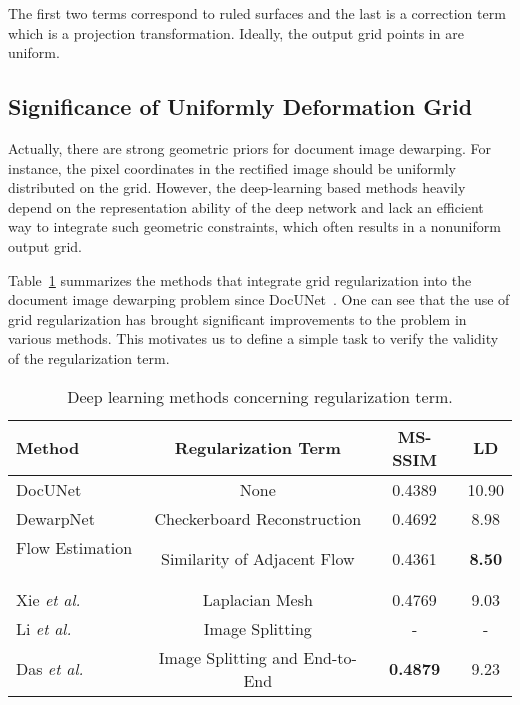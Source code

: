 \documentclass[10pt,twocolumn,letterpaper]{article}
\begin{document}
The first two terms correspond to ruled surfaces and the last is a correction term which is a projection transformation. 
Ideally, the output grid points in  are uniform.


\subsection{Significance of Uniformly Deformation Grid}

Actually, there are strong geometric priors for document image dewarping. For instance, the pixel coordinates in the rectified image should be uniformly distributed on the grid. However, the deep-learning based methods heavily depend on the representation ability of the deep network and lack an efficient way to integrate such geometric constraints, which often results in a nonuniform output grid. 

Table~\ref{tab:Related method} summarizes the methods that integrate grid regularization into the document image dewarping problem since DocUNet~\cite{Ma_2018_CVPR}. One can see that the use of grid regularization has brought significant improvements to the problem in various methods. This motivates us to define a simple task to verify the validity of the regularization term. 


\begin{table}[!t]
\scriptsize
  \centering
    \caption{Deep learning methods concerning regularization term.}
    \vspace{-3mm}
  \begin{tabular}{lccc}
    \toprule
    \textbf{Method} &  \textbf{Regularization Term}  & \textbf{MS-SSIM}   & \textbf{LD} \\
    \midrule
    DocUNet~\cite{Ma_2018_CVPR} & None   & 0.4389& 10.90\\
    DewarpNet~\cite{Das_2019_ICCV} & Checkerboard Reconstruction & 0.4692 & 8.98 \\
    Flow Estimation ~\cite{xie2020dewarping}&Similarity of Adjacent Flow & 0.4361&\textbf{8.50}\\
    Xie {\em et al.} ~\cite{xie2021document}& Laplacian Mesh & 0.4769&9.03\\
    Li {\em et al.} ~\cite{li2019document} & Image Splitting  &-  &-\\
    Das {\em et al.} ~\cite{das2021end} & Image Splitting and End-to-End& \textbf{0.4879}&9.23\\
    \bottomrule
  \end{tabular}
  \label{tab:Related method}
  \vspace{-1mm}
\end{table}
\end{document}
